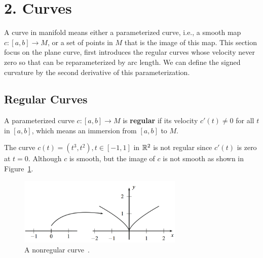 
\section[Lecture 2--{Curves}]{2. Curves}
A curve in manifold means either a parameterized curve, i.e., a smooth map $c: [a,b]\rightarrow M$, 
or a set of points in $M$ that is the image of this map.
This section focus on the plane curve, first introduces the regular curves whose velocity never zero
so that can be reparameterized
by arc length. We can define the signed curvature by the second derivative of 
this parameterization.
\subsection{Regular Curves}
\begin{definition}
    A parameterized curve $c: [a, b] \rightarrow M$ is \textbf{regular}
     if its velocity $c'(t)\neq 0$ for all $t$ in $[a, b]$, which means an immersion from
     $[a, b]$ to $M$.
\end{definition}
\begin{example}
    The curve $c(t)=(t^3, t^2), t\in [-1, 1]$ in ${\mathbb{R}}^2$ is not regular since $c'(t)$ is zero
    at $t=0$. 
    Although $c$ is smooth, but the image of $c$ is not smooth as shown 
    in Figure~\ref{fig. t3t2 image}.
\end{example}
\begin{figure}[htb]
    \centering
    \includegraphics[width=0.7\textwidth]{../Lectures/Figures/curv_image.png}
    \caption{A nonregular curve~\cite[p.~9]{tuDifferentialGeometry2017}.}
    \label{fig. t3t2 image}
\end{figure}
